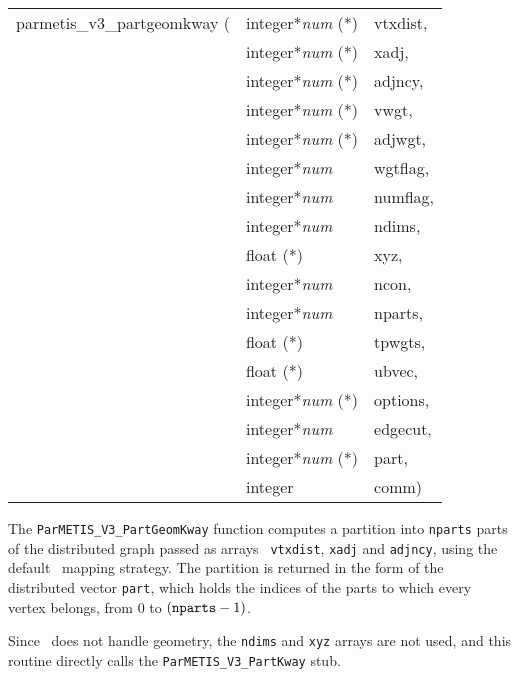 \begin{itemize}
{\tt\begin{tabular}{l@{}ll}
parmetis\_v3\_partgeomkway ( & integer*{\it num} (*) & vtxdist, \\
                             & integer*{\it num} (*) & xadj, \\
                             & integer*{\it num} (*) & adjncy, \\
                             & integer*{\it num} (*) & vwgt, \\
                             & integer*{\it num} (*) & adjwgt, \\
                             & integer*{\it num}     & wgtflag, \\
                             & integer*{\it num}     & numflag, \\
                             & integer*{\it num}     & ndims, \\
                             & float (*)             & xyz, \\
                             & integer*{\it num}     & ncon, \\
                             & integer*{\it num}     & nparts, \\
                             & float (*)             & tpwgts, \\
                             & float (*)             & ubvec, \\
                             & integer*{\it num} (*) & options, \\
                             & integer*{\it num}     & edgecut, \\
                             & integer*{\it num} (*) & part, \\
                             & integer               & comm)
\end{tabular}}

\progdes

The {\tt ParMETIS\_V3\_PartGeomKway} function computes a partition into
{\tt nparts} parts of the distributed graph passed as arrays {\tt
vtxdist}, {\tt xadj} and {\tt adjncy}, using the default
\ptscotch\ mapping strategy. The partition is returned in the form of
the distributed vector {\tt part}, which holds the indices of the
parts to which every vertex belongs, from $0$ to $(\mbox{\tt nparts} -
1)$.

Since \scotch\ does not handle geometry, the {\tt ndims} and {\tt xyz}
arrays are not used, and this routine directly calls the
{\tt ParMETIS\_\lbt V3\_\lbt Part\lbt Kway} stub.
\end{itemize}

